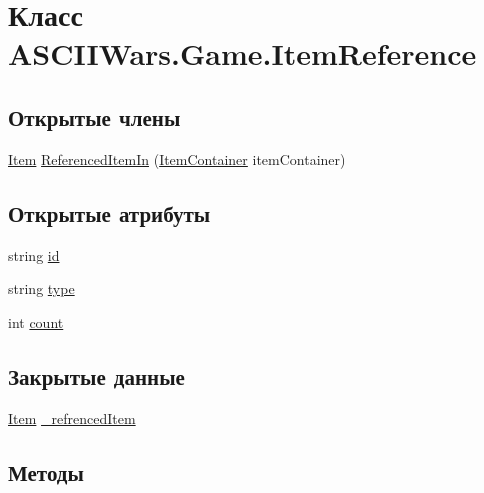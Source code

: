 \hypertarget{class_a_s_c_i_i_wars_1_1_game_1_1_item_reference}{}\section{Класс A\+S\+C\+I\+I\+Wars.\+Game.\+Item\+Reference}
\label{class_a_s_c_i_i_wars_1_1_game_1_1_item_reference}
\subsection*{Открытые члены}
\begin{DoxyCompactItemize}
\item 
\hyperlink{class_a_s_c_i_i_wars_1_1_game_1_1_item}{Item} \hyperlink{class_a_s_c_i_i_wars_1_1_game_1_1_item_reference_a255b887a863359e432143c95e98600f4}{Referenced\+Item\+In} (\hyperlink{class_a_s_c_i_i_wars_1_1_game_1_1_item_container}{Item\+Container} item\+Container)
\end{DoxyCompactItemize}
\subsection*{Открытые атрибуты}
\begin{DoxyCompactItemize}
\item 
string \hyperlink{class_a_s_c_i_i_wars_1_1_game_1_1_item_reference_aefee1e2d5dac90be31ad4a9a3ee6fba2}{id}
\item 
string \hyperlink{class_a_s_c_i_i_wars_1_1_game_1_1_item_reference_a7aeb379f2178fed498bd782a01888de3}{type}
\item 
int \hyperlink{class_a_s_c_i_i_wars_1_1_game_1_1_item_reference_a27438c24e65ee1a384eacf025c9e7e60}{count}
\end{DoxyCompactItemize}
\subsection*{Закрытые данные}
\begin{DoxyCompactItemize}
\item 
\hyperlink{class_a_s_c_i_i_wars_1_1_game_1_1_item}{Item} \hyperlink{class_a_s_c_i_i_wars_1_1_game_1_1_item_reference_a15d2baba4e97b1f60ae57f96f65429cb}{\+\_\+refrenced\+Item}
\end{DoxyCompactItemize}


\subsection{Методы}
\hypertarget{class_a_s_c_i_i_wars_1_1_game_1_1_item_reference_a255b887a863359e432143c95e98600f4}{}\label{class_a_s_c_i_i_wars_1_1_game_1_1_item_reference_a255b887a863359e432143c95e98600f4} 
